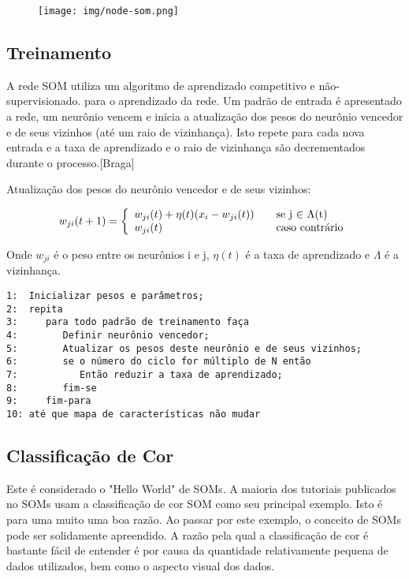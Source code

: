 \documentclass[a4paper]{article}
\begin{document}
\begin{figure}[ht]
\centering
\texttt{[image: img/node-som.png]}
\label{fig:som-node}
\end{figure}

\subsection{Treinamento}\label{treinamento}
A rede SOM utiliza um algoritmo de aprendizado competitivo e não-supervisionado. para o aprendizado da rede. Um padrão de entrada é apresentado a rede, um neurônio vencem e inicia a atualização dos pesos do neurônio vencedor e de seus vizinhos (até um raio de vizinhança). Isto repete para cada nova entrada e a taxa de aprendizado e o raio de vizinhança são decrementados durante o processo.[Braga]

Atualização dos pesos do neurônio vencedor e de seus vizinhos:

\[ w_{ji}(t+1) = \left\{ 
  \begin{array}{l l}
    w_{ji}(t) + \eta(t)(x_{i}- w_{ji}(t)) & \quad \text{se j $\in$ $\Lambda$(t)}\\
    w_{ji}(t) & \quad \text{caso contrário}
  \end{array} \right.\]

Onde $w_{ji}$ é o peso entre os neurônios i e j, $\eta(t)$ é a taxa de aprendizado e $\Lambda$ é a vizinhança.

\begin{verbatim}
1:  Inicializar pesos e parâmetros;
2:  repita
3:     para todo padrão de treinamento faça
4:        Definir neurônio vencedor;
5:        Atualizar os pesos deste neurônio e de seus vizinhos;
6:        se o número do ciclo for múltiplo de N então
7:           Então reduzir a taxa de aprendizado;
8:        fim-se
9:     fim-para
10: até que mapa de características não mudar
\end{verbatim}

\subsection{Classificação de Cor}
Este é considerado o "Hello World" de SOMs. A maioria dos tutoriais publicados no
SOMs usam a classificação de cor SOM como seu principal exemplo. Isto é para uma muito
uma boa razão. Ao passar por este exemplo, o conceito de SOMs pode ser solidamente
apreendido. A razão pela qual a classificação de cor é bastante fácil de entender é por causa da
quantidade relativamente pequena de dados utilizados, bem como o aspecto visual dos
dados.
\end{document}
